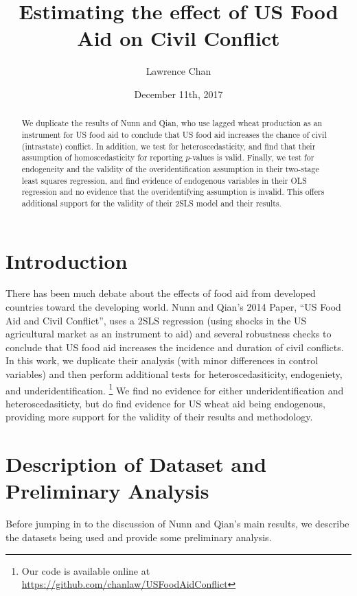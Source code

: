 \documentclass{article}
\title{Estimating the effect of US Food Aid on Civil Conflict}
\author{Lawrence Chan}
\date{December 11th, 2017}
\begin{document}
\maketitle
\begin{abstract}
We duplicate the results of Nunn and Qian, who use lagged wheat production as an instrument for US food aid to conclude that US food aid increases the chance of civil (intrastate) conflict. In addition, we test for heteroscedasticity, and find that their assumption of homoscedasticity for reporting $p$-values is valid. Finally, we test for endogeneity and the validity of the overidentification assumption in their two-stage least squares regression, and find evidence of endogenous variables in their OLS regression and no evidence that the overidentifying assumption is invalid. This offers additional support for the validity of their 2SLS model and their results. 
\end{abstract}
\section{Introduction}
There has been much debate about the effects of food aid from developed countries toward the developing world. Nunn and Qian’s 2014 Paper, “US Food Aid and Civil Conflict”, uses a 2SLS regression (using shocks in the US agricultural market as an instrument to aid) and several robustness checks to conclude that US food aid increases the incidence and duration of civil conflicts.\\

In this work, we duplicate their analysis (with minor differences in control variables) and then perform additional tests for heteroscedasiticity, endogeniety, and underidentification. \footnote{Our code is available online at \href{https://github.com/chanlaw/USFoodAidConflict}{https://github.com/chanlaw/USFoodAidConflict}} We find no evidence for either underidentification and heteroscedasiticty, but do find evidence for US wheat aid being endogenous, providing more support for the validity of their results and methodology.

\section{Description of Dataset and Preliminary Analysis}
Before jumping in to the discussion of Nunn and Qian's main results, we describe the datasets being used and provide some preliminary analysis.\\
\end{document}
